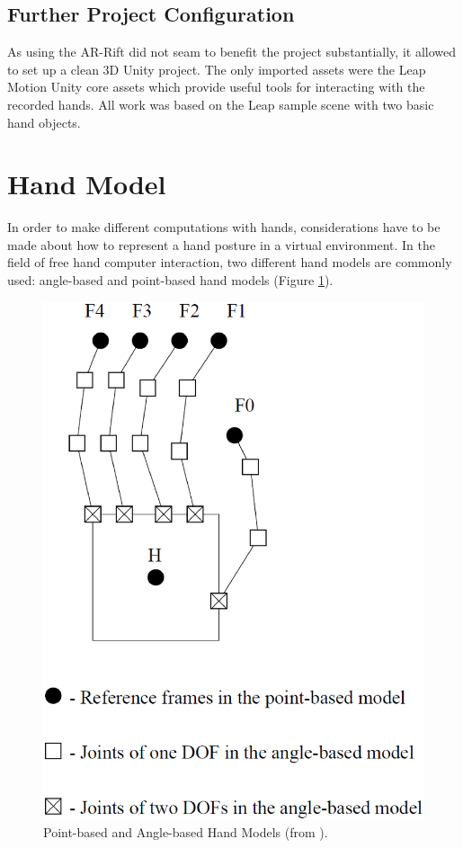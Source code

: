 \subsection{Further Project Configuration}

As using the AR-Rift did not seam to benefit the project substantially, it allowed to set up a clean 3D Unity project. The only imported assets were the Leap Motion Unity core assets which provide useful tools for interacting with the recorded hands. All work was based on the Leap sample scene with two basic hand objects. 

\section{Hand Model}

In order to make different computations with hands, considerations have to be made about how to represent a hand posture in a virtual environment. In the field of free hand computer interaction, two different hand models are commonly used: angle-based and point-based hand models (Figure \ref{fig:anglepoint}).

\begin{figure}
\centering
\includegraphics[width=\textwidth]{anglepoint}
\caption{Point-based and Angle-based Hand Models (from \cite{su1994logical}).}
\label{fig:anglepoint}
\end{figure}

